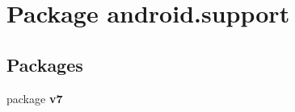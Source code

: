 \section{Package android.\+support}
\label{namespaceandroid_1_1support}
\subsection*{Packages}
\begin{DoxyCompactItemize}
\item 
package \textbf{ v7}
\end{DoxyCompactItemize}
